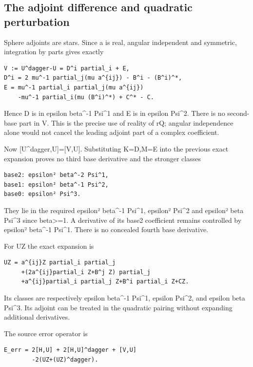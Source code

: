 \documentclass[11pt]{article}
\theoremstyle{definition}
\theoremstyle{remark}
\numberwithin{equation}{section}
\begin{document}
\hypertarget{source-71285ede3265-the-adjoint-difference-and-quadratic-perturbation}{%
\subsection{The adjoint difference and quadratic
perturbation}\label{source-71285ede3265-the-adjoint-difference-and-quadratic-perturbation}}

Sphere adjoints are stars. Since a is real, angular independent and
symmetric, integration by parts gives exactly

\begin{verbatim}
V := U^dagger-U = D^i partial_i + E,
D^i = 2 mu^-1 partial_j(mu a^{ij}) - B^i - (B^i)^*,
E = mu^-1 partial_i partial_j(mu a^{ij})
    -mu^-1 partial_i(mu (B^i)^*) + C^* - C.
\end{verbatim}

Hence D is in epsilon beta\^{}-1 Psi\^{}1 and E is in epsilon Psi\^{}2.
There is no second-base part in V. This is the precise use of reality of
rQ; angular independence alone would not cancel the leading adjoint part
of a complex coefficient.

Now {[}U\^{}dagger,U{]}={[}V,U{]}. Substituting K=D,M=E into the
previous exact expansion proves no third base derivative and the
stronger classes

\begin{verbatim}
base2: epsilon² beta^-2 Psi^1,
base1: epsilon² beta^-1 Psi^2,
base0: epsilon² Psi^3.
\end{verbatim}

They lie in the required epsilon² beta\^{}-1 Psi\^{}1, epsilon² Psi\^{}2
and epsilon² beta Psi\^{}3 since beta\textgreater=1. A derivative of its
base2 coefficient remains controlled by epsilon² beta\^{}-1 Psi\^{}1.
There is no concealed fourth base derivative.

For UZ the exact expansion is

\begin{verbatim}
UZ = a^{ij}Z partial_i partial_j
     +(2a^{ij}partial_i Z+B^j Z) partial_j
     +a^{ij}partial_i partial_j Z+B^i partial_i Z+CZ.
\end{verbatim}

Its classes are respectively epsilon beta\^{}-1 Psi\^{}1, epsilon
Psi\^{}2, and epsilon beta Psi\^{}3. Its adjoint can be treated in the
quadratic pairing without expanding additional derivatives.

The source error operator is

\begin{verbatim}
E_err = 2[H,U] + 2[H,U]^dagger + [V,U]
        -2(UZ+(UZ)^dagger).
\end{verbatim}
\end{document}
